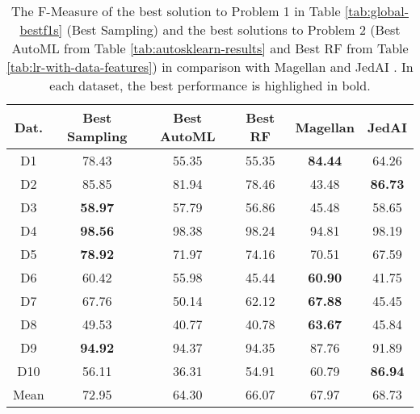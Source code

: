 \begin{table}[t]
\centering
\small 
\setlength{\tabcolsep}{2.5pt}
\caption{{The F-Measure of the best solution to Problem 1 in Table \ref{tab:global-bestf1s} (Best Sampling) and the best solutions to Problem 2 (Best AutoML from Table \ref{tab:autosklearn-results} and Best RF from Table \ref{tab:lr-with-data-features}) in comparison with 
Magellan \cite{DBLP:journals/pvldb/KondaDCDABLPZNP16} and JedAI \cite{DBLP:journals/is/PapadakisMGSTGB20}. In each dataset, the best performance is highlighed in bold.}}
\label{tab:baselines}
\begin{tabular}{|c|c|c|c|c|c|}
\hline
Dat. & Best Sampling & Best AutoML & Best RF & Magellan & JedAI \\
\hline
\hline
D1	& 78.43	& 55.35	& 55.35	& \textbf{84.44}	& 64.26\\
D2	& 85.85	& 81.94	& 78.46	& 43.48	& \textbf{86.73}\\
D3	& \textbf{58.97} & 57.79 & 56.86 & 45.48 & 58.65\\
D4	& \textbf{98.56} & 98.38 & 98.24 & 94.81 & 98.19\\
D5	& \textbf{78.92} & 71.97 & 74.16 & 70.51 & 67.59\\
D6	& 60.42	& 55.98	& 45.44	& \textbf{60.90} & 41.75\\
D7	& 67.76	& 50.14	& 62.12	& \textbf{67.88}	& 45.45\\
D8	& 49.53	& 40.77	& 40.78	& \textbf{63.67}	& 45.84\\
D9	& \textbf{94.92}	& 94.37	& 94.35	& 87.76	& 91.89 \\
D10	& 56.11	& 36.31	& 54.91	& 60.79	& \textbf{86.94} \\
\hline
\hline
Mean & 72.95 & 64.30 & 66.07 & 67.97 & 68.73 \\
\hline
\end{tabular}
\end{table}
